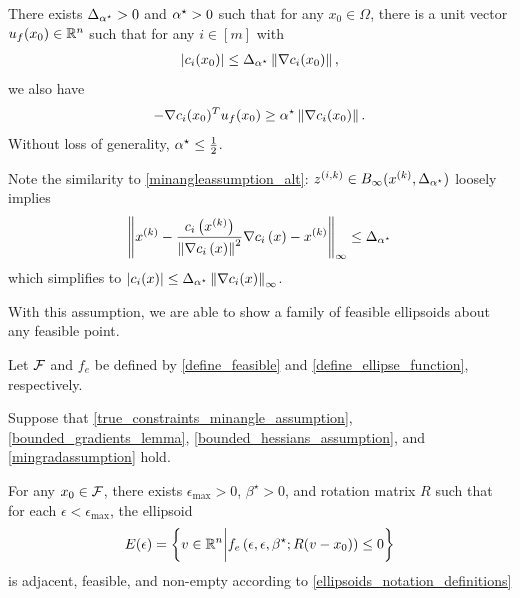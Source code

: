 
\begin{assumption}
\label{true_constraints_minangle_assumption}
There exists ${\Delta_{\alpha^{\star}}} > 0$ and ${ \alpha^{\star} } > 0$ such that for any $x_0 \in \Omega$,
there is a unit vector ${u_{f}(x_0)} \in \mathbb R^n$ such that 
for any $i \in [m]$ with
\begin{align*}
\left|c_i(x_0)\right| \le {\Delta_{\alpha^{\star}}} \left\|\nabla c_i(x_0)\right\|,
\end{align*}
we also have
\begin{align*}
-\nabla c_i(x_0)^T {u_{f}(x_0)} \ge { \alpha^{\star} } \left\| \nabla c_i(x_0) \right\|.
\end{align*}
Without loss of generality, ${ \alpha^{\star} } \le \frac 1 2$.
\end{assumption}

Note the similarity to \cref{minangleassumption_alt}:
${z^{(i, k)}} \in B_{\infty}(x^{(k)}, {\Delta_{\alpha^{\star}}})$ loosely implies
\begin{align*}
\left\|x^{(k)} - \frac{c_i\left(x^{(k)}\right)}{\left\|\nabla c_i\left(x\right)\right\|^2} \nabla c_i\left(x\right)  - x^{(k)}\right\|_{\infty} \le {\Delta_{\alpha^{\star}}}
\end{align*}
which simplifies to
$\left|c_i(x)\right| \le {\Delta_{\alpha^{\star}}} \left\|\nabla c_i(x)\right\|_{\infty}$.

With this assumption, we are able to show a family of feasible ellipsoids about any feasible point.

\begin{theorem}

\label{nonconvex_ellipsoid_existence}
Let ${\mathcal F}$ and $f_e$ be defined by \cref{define_feasible} and \cref{define_ellipse_function}, respectively.

Suppose that 
\cref{true_constraints_minangle_assumption},
\cref{bounded_gradients_lemma},
\cref{bounded_hessians_assumption},
and \cref{mingradassumption} hold.

For any $x_0 \in {\mathcal F}$,
there exists $\epsilon_{\textrm{max}} > 0$, $\beta^{\star}>0$, and rotation matrix $R$ such that for each $\epsilon < \epsilon_{\textrm{max}}$, the ellipsoid
\begin{align*}
E(\epsilon) = \left\{v \in \mathbb R^n \bigg| f_e\left(\epsilon, \epsilon, \beta^{\star}; R(v - x_0)\right) \le 0\right\}
\end{align*}
is adjacent, feasible, and non-empty according to \cref{ellipsoids_notation_definitions}
\end{theorem}

